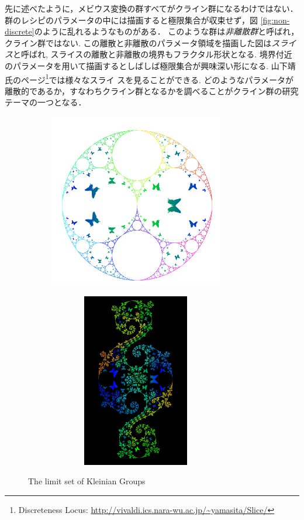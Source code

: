 先に述べたように，メビウス変換の群すべてがクライン群になるわけではない．
群のレシピのパラメータの中には描画すると極限集合が収束せず，図
\ref{fig:non-discrete}のように乱れるようなものがある．
このような群は\emph{非離散群}と呼ばれ，クライン群ではない.
この離散と非離散のパラメータ領域を描画した図は\emph{スライス}と呼ばれ,
スライスの離散と非離散の境界もフラクタル形状となる.
境界付近のパラメータを用いて描画するとしばしば極限集合が興味深い形になる.
山下靖氏のページ\footnote{Discreteness Locus:
\url{http://vivaldi.ics.nara-wu.ac.jp/~yamasita/Slice/}}では様々なスライ
スを見ることができる.
どのようなパラメータが離散的であるか，すなわちクライン群となるかを調べることがクライン群の研究テーマの一つとなる．

\begin{figure}[h!tbp]
 \begin{subfigure}{0.49\hsize}
   \begin{center}
    \includegraphics[width=3in, height=3in, keepaspectratio]{../img/klein/apr.pdf}
    \caption{}
    \label{fig:apr}
   \end{center}
 \end{subfigure}
 \hspace*{\fill}
 \begin{subfigure}{0.49\hsize}
   \begin{center}
    \includegraphics[width=3in, height=3in, keepaspectratio]{../img/klein/comp.pdf}
    \caption{}
    \label{fig:comp}
   \end{center}
 \end{subfigure}
 \caption{The limit set of Kleinian Groups}
 \label{fig:limitsetWithOrbit}
\end{figure}

